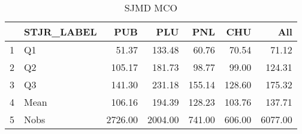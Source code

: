 \begin{table}[ht]
\centering
\begin{tabular}{rlrrrrr}
  \hline
 & STJR\_LABEL & PUB & PLU & PNL & CHU & All \\ 
  \hline
1 & Q1 & 51.37 & 133.48 & 60.76 & 70.54 & 71.12 \\ 
  2 & Q2 & 105.17 & 181.73 & 98.77 & 99.00 & 124.31 \\ 
  3 & Q3 & 141.30 & 231.18 & 155.14 & 128.60 & 175.32 \\ 
  4 & Mean & 106.16 & 194.39 & 128.23 & 103.76 & 137.71 \\ 
  5 & Nobs & 2726.00 & 2004.00 & 741.00 & 606.00 & 6077.00 \\ 
   \hline
\end{tabular}
\caption{SJMD MCO} 
\end{table}
